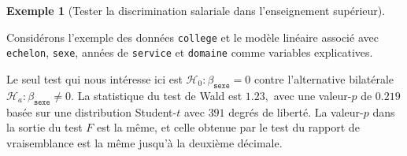 \documentclass[
  11pt,
  letterpaper,
]{scrbook}
\newenvironment{Shaded}{\begin{snugshade}}{\end{snugshade}}
\newcommand{\AttributeTok}[1]{\textcolor[rgb]{0.40,0.45,0.13}{#1}}
\newcommand{\CommentTok}[1]{\textcolor[rgb]{0.37,0.37,0.37}{#1}}
\newcommand{\ConstantTok}[1]{\textcolor[rgb]{0.56,0.35,0.01}{#1}}
\newcommand{\DecValTok}[1]{\textcolor[rgb]{0.68,0.00,0.00}{#1}}
\newcommand{\FunctionTok}[1]{\textcolor[rgb]{0.28,0.35,0.67}{#1}}
\newcommand{\NormalTok}[1]{\textcolor[rgb]{0.00,0.23,0.31}{#1}}
\newcommand{\OtherTok}[1]{\textcolor[rgb]{0.00,0.23,0.31}{#1}}
\newcommand{\SpecialCharTok}[1]{\textcolor[rgb]{0.37,0.37,0.37}{#1}}
\newcommand{\StringTok}[1]{\textcolor[rgb]{0.13,0.47,0.30}{#1}}
\theoremstyle{plain}
\theoremstyle{plain}
\theoremstyle{definition}
\newtheorem{example}{Exemple}[chapter]
\theoremstyle{definition}
\theoremstyle{remark}
\begin{document}
\begin{example}[Tester la discrimination salariale dans l'enseignement
supérieur]\protect\hypertarget{exm-tests-college}{}\label{exm-tests-college}

Considérons l'exemple des données \texttt{college} et le modèle linéaire
associé avec \texttt{echelon}, \texttt{sexe}, années de \texttt{service}
et \texttt{domaine} comme variables explicatives.

\begin{Shaded}
\end{Shaded}

Le seul test qui nous intéresse ici est
\(\mathscr{H}_0 : \beta_{\texttt{sexe}} = 0\) contre l'alternative
bilatérale \(\mathscr{H}_a : \beta_{\texttt{sexe}} \neq 0.\) La
statistique du test de Wald est \(1.23,\) avec une valeur-\(p\) de
\(0.219\) basée sur une distribution Student-\(t\) avec \(391\) degrés
de liberté. La valeur-\(p\) dans la sortie du test \(F\) est la même, et
celle obtenue par le test du rapport de vraisemblance est la même
jusqu'à la deuxième décimale.


\end{example}
\end{document}
